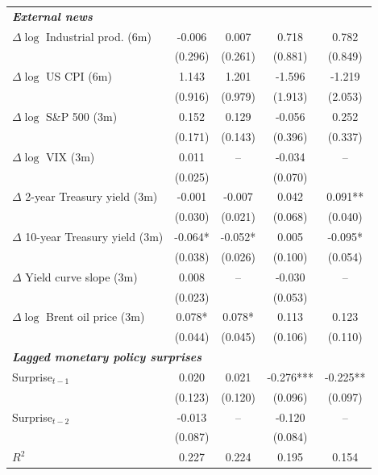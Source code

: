 \documentclass[12pt, reqno]{article}
\begin{document}
\begin{table}[htbp]
{\begin{tabular}{lcccc}
\multicolumn{5}{l}{\textbf{\emph{External news}}} \\[0.2em]

$\Delta \log$ Industrial prod. (6m)
& -0.006 & 0.007 
& 0.718 & 0.782 \\
& (0.296) & (0.261)
& (0.881) & (0.849) \\

$\Delta \log$ US CPI (6m)
& 1.143 & 1.201 
& -1.596 & -1.219 \\
& (0.916) & (0.979)
& (1.913) & (2.053) \\

$\Delta \log$ S\&P 500 (3m)
& 0.152 & 0.129 
& -0.056 & 0.252 \\
& (0.171) & (0.143)
& (0.396) & (0.337) \\

$\Delta \log$ VIX (3m)
& 0.011 & -- 
& -0.034 & -- \\
& (0.025) & 
& (0.070) & \\

$\Delta$ 2-year Treasury yield (3m)
& -0.001 & -0.007 
& 0.042 & 0.091** \\
& (0.030) & (0.021)
& (0.068) & (0.040) \\

$\Delta$ 10-year Treasury yield (3m)
& -0.064* & -0.052* 
& 0.005 & -0.095* \\
& (0.038) & (0.026)
& (0.100) & (0.054) \\

$\Delta$ Yield curve slope (3m)
& 0.008 & -- 
& -0.030 & -- \\
& (0.023) & 
& (0.053) & \\

$\Delta \log$ Brent oil price (3m)
& 0.078* & 0.078* 
& 0.113 & 0.123 \\
& (0.044) & (0.045)
& (0.106) & (0.110) \\[0.4em]

\multicolumn{5}{l}{\textbf{\emph{Lagged monetary policy surprises}}} \\[0.2em]

Surprise$_{t-1}$
& 0.020 & 0.021 
& -0.276*** & -0.225** \\
& (0.123) & (0.120)
& (0.096) & (0.097) \\

Surprise$_{t-2}$
& -0.013 & -- 
& -0.120 & -- \\
& (0.087) & 
& (0.084) & \\

\midrule
$R^2$
& 0.227 & 0.224
& 0.195 & 0.154 \\


\end{tabular}}
\end{table}
\end{document}
